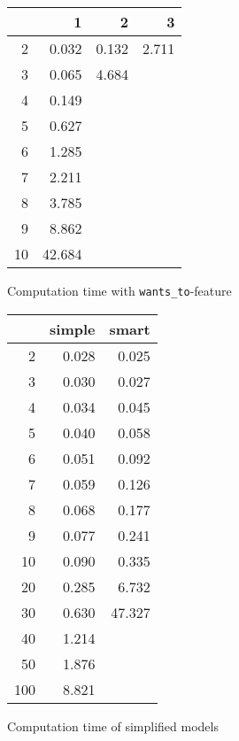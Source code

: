 \documentclass[a4paper,10pt]{article}
\begin{document}
	\begin{figure}[H]
		\begin{center}
			\begin{tabular}{r|r|r|r}
				\backslashbox{$F$}{$n$} & 1 & 2 & 3 \\ \hline
				2	& 0.032		& 0.132		& 2.711		\\ \hline
				3	& 0.065		& 4.684		&			\\ \hline
				4	& 0.149		&			&			\\ \hline
				5	& 0.627		&			&			\\ \hline
				6	& 1.285		&			&			\\ \hline 
				7	& 2.211		&			&			\\ \hline
				8	& 3.785		&			&			\\ \hline
				9	& 8.862		&			&			\\ \hline
				10	& 42.684	&			&			\\ \hline
			\end{tabular}
		\end{center}
		
		\caption{Computation time with \texttt{wants\_to}-feature}
	\end{figure}
	
	\begin{figure}[H]
		\begin{center}
			\begin{tabular}{r|r|r}
				\backslashbox{$F$}{$n$} & simple & smart \\ \hline
				2	& 0.028		& 0.025		\\ \hline
				3	& 0.030		& 0.027		\\ \hline
				4	& 0.034		& 0.045		\\ \hline
				5	& 0.040		& 0.058		\\ \hline
				6	& 0.051		& 0.092		\\ \hline 
				7	& 0.059		& 0.126		\\ \hline
				8	& 0.068		& 0.177		\\ \hline
				9	& 0.077		& 0.241		\\ \hline
				10	& 0.090		& 0.335		\\ \hline
				20	& 0.285		& 6.732		\\ \hline
				30	& 0.630		& 47.327	\\ \hline
				40	& 1.214		&		\\ \hline
				50	& 1.876		&		\\ \hline
				100	& 8.821		&		\\ \hline
			\end{tabular}
		\end{center}
		
		\caption{Computation time of simplified models}
	\end{figure}
	
\end{document}
